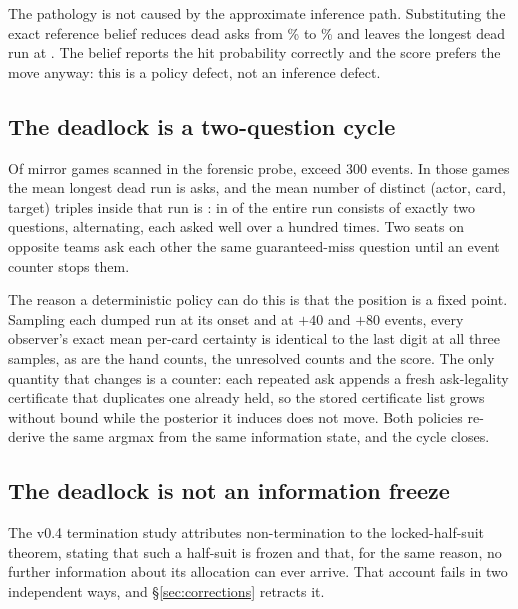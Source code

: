 The pathology is not caused by the approximate inference path. Substituting the
exact reference belief reduces dead asks from \numDeadAsk\% to
\numBlockDeadAsk\% and leaves the longest dead run at \numBlockDeadRun{}. The
belief reports the hit probability correctly and the score prefers the move
anyway: this is a policy defect, not an inference defect.

\subsection{The deadlock is a two-question cycle}
\label{sec:diag-cycle}

Of \numScanGames{} mirror games scanned in the forensic probe, \numLongGames{}
exceed 300 events. In those games the mean longest dead run is \numCycleLen{}
asks, and the mean number of distinct (actor, card, target) triples inside that
run is \numCycleTriples{}: in \numPureCycle{} of \numLongGames{} the entire run
consists of exactly two questions, alternating, each asked well over a hundred
times. Two seats on opposite teams ask each other the same guaranteed-miss
question until an event counter stops them.

The reason a deterministic policy can do this is that the position is a fixed
point. Sampling each dumped run at its onset and at $+40$ and $+80$ events, every
observer's exact mean per-card certainty is identical to the last digit at all
three samples, as are the hand counts, the unresolved counts and the score. The
only quantity that changes is a counter: each repeated ask appends a fresh
ask-legality certificate that duplicates one already held, so the stored
certificate list grows without bound while the posterior it induces does not
move. Both policies re-derive the same argmax from the same information state,
and the cycle closes.

\subsection{The deadlock is not an information freeze}
\label{sec:diag-information}

The v0.4 termination study attributes non-termination to the locked-half-suit
theorem, stating that such a half-suit is frozen and that, for the same reason,
no further information about its allocation can ever arrive. That account fails
in two independent ways, and \S\ref{sec:corrections} retracts it.

